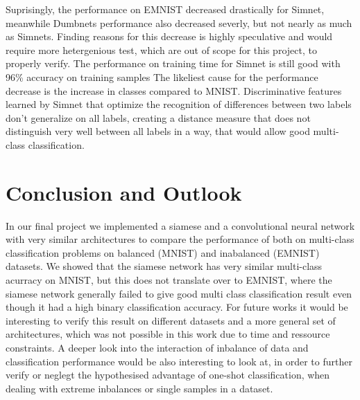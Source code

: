 \documentclass[a4paper,pt12]{article}
\begin{document}
Suprisingly, the performance on EMNIST decreased drastically for Simnet, meanwhile Dumbnets performance also decreased severly, but not nearly as much as Simnets. \newline
Finding reasons for this decrease is highly speculative and would require more hetergenious test, which are out of scope for this project, to properly verify. The performance on training  time for Simnet is still good with 96\% accuracy on training samples The likeliest cause for the performance decrease is the increase in classes compared to MNIST. Discriminative features learned by Simnet that optimize the recognition of differences between two labels don't generalize on all labels, creating a distance measure that does not distinguish very well between all labels in a way, that would allow good multi-class classification. \newline

\section{Conclusion and Outlook}
In our final project we implemented a siamese and a convolutional neural network with very similar architectures to compare the performance of both on multi-class classification problems on balanced (MNIST) and inabalanced (EMNIST) datasets. \newline
We showed that the siamese network has very similar multi-class acurracy on MNIST, but this does not translate over to EMNIST, where the siamese network generally failed to give good multi class classification result even though it had a high binary classification accuracy. \newline
For future works it would be interesting to verify this result on different datasets and a more general set of architectures, which was not possible in this work due to time and ressource constraints. A deeper look into the interaction of inbalance of data and classification performance would be also interesting to look at, in order to further verify or neglegt the hypothesised advantage of one-shot classification, when dealing with extreme inbalances or single samples in a dataset.


%
%


\nocite{*}

\end{document}
